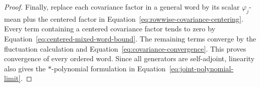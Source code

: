 \begin{proof}
Finally, replace each covariance factor in a general word
by its scalar \(\varphi_j\)-mean plus the centered factor
in Equation~\eqref{eq:rowwise-covariance-centering}. Every term
containing a centered covariance factor tends to zero by
Equation~\eqref{eq:centered-mixed-word-bound}. The remaining terms
converge by the fluctuation calculation and
Equation~\eqref{eq:covariance-convergence}. This proves convergence
of every ordered word. Since all generators are
self-adjoint, linearity also gives the
\(*\)-polynomial formulation in
Equation~\eqref{eq:joint-polynomial-limit}.
\end{proof}
